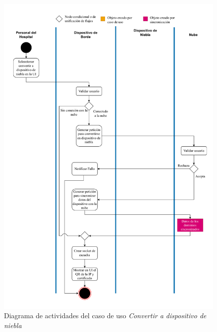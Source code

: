\begin{figure}
    \centering
    \includegraphics[width=\textwidth, height=\textheight, keepaspectratio]{Imagenes/Implementacion/ConvertirALiderDA.pdf}
    \caption{Diagrama de actividades del caso de uso \textit{Convertir a dispositivo de niebla}}
    \label{fig:diagActConvertALider}
\end{figure}


